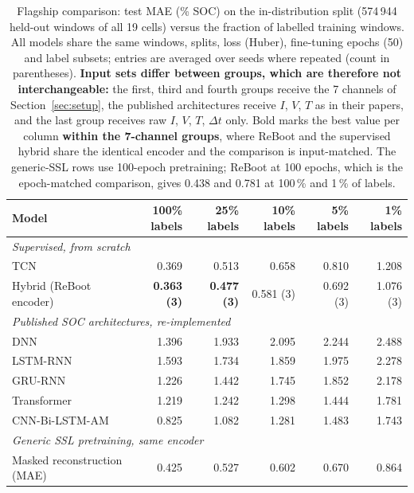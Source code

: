 \begin{table}[t]
\centering
\footnotesize
\setlength{\tabcolsep}{4pt}
\caption{Flagship comparison: test MAE (\% SOC) on the in-distribution split (574\,944 held-out windows of all 19 cells) versus the fraction of labelled training windows. All models share the same windows, splits, loss (Huber), fine-tuning epochs (50) and label subsets; entries are averaged over seeds where repeated (count in parentheses). \textbf{Input sets differ between groups, which are therefore not interchangeable:} the first, third and fourth groups receive the 7 channels of Section~\ref{sec:setup}, the published architectures receive $I$, $V$, $T$ as in their papers, and the last group receives raw $I$, $V$, $T$, $\Delta t$ only. Bold marks the best value per column \textbf{within the 7-channel groups}, where ReBoot and the supervised hybrid share the identical encoder and the comparison is input-matched. The generic-SSL rows use 100-epoch pretraining; ReBoot at 100 epochs, which is the epoch-matched comparison, gives 0.438 and 0.781 at 100\,\% and 1\,\% of labels.}
\label{tab:flagship}
\begin{tabular}{lrrrrr}
\toprule
Model & 100\% labels & 25\% labels & 10\% labels & 5\% labels & 1\% labels \\
\midrule
\multicolumn{6}{l}{\textit{Supervised, from scratch}} \\
\quad TCN~\cite{bai2018tcn} & 0.369 & 0.513 & 0.658 & 0.810 & 1.208 \\
\quad Hybrid (ReBoot encoder) & \textbf{0.363 (3)} & \textbf{0.477 (3)} & 0.581 (3) & 0.692 (3) & 1.076 (3) \\
\multicolumn{6}{l}{\textit{Published SOC architectures, re-implemented}} \\
\quad DNN~\cite{chemali2018dnn} & 1.396 & 1.933 & 2.095 & 2.244 & 2.488 \\
\quad LSTM-RNN~\cite{chemali2018lstm} & 1.593 & 1.734 & 1.859 & 1.975 & 2.278 \\
\quad GRU-RNN~\cite{yang2019gru} & 1.226 & 1.442 & 1.745 & 1.852 & 2.178 \\
\quad Transformer~\cite{hannan2021transformer} & 1.219 & 1.242 & 1.298 & 1.444 & 1.781 \\
\quad CNN-Bi-LSTM-AM~\cite{li2026cnnbilstm} & 0.825 & 1.082 & 1.281 & 1.483 & 1.743 \\
\multicolumn{6}{l}{\textit{Generic SSL pretraining, same encoder}} \\
\quad Masked reconstruction (MAE)~\cite{he2022mae} & 0.425 & 0.527 & 0.602 & 0.670 & 0.864 \\

\end{tabular}
\end{table}
